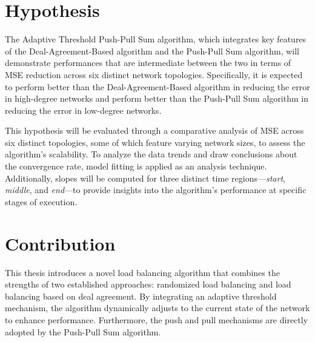 \section{Hypothesis}\label{sec:hypothesis}
The Adaptive Threshold Push-Pull Sum algorithm, which integrates key features of the Deal-Agreement-Based algorithm and the Push-Pull Sum algorithm, will demonstrate performances that are intermediate between the two in terms of MSE reduction across six distinct network topologies. Specifically, it is expected to perform better than the Deal-Agreement-Based algorithm in reducing the error in high-degree networks and perform better than the Push-Pull Sum algorithm in reducing the error in low-degree networks.

This hypothesis will be evaluated through a comparative analysis of MSE across six distinct topologies, some of which feature varying network sizes, to assess the algorithm's scalability. To analyze the data trends and draw conclusions about the convergence rate, model fitting is applied as an analysis technique. Additionally, slopes will be computed for three distinct time regions—\textit{start}, \textit{middle}, and \textit{end}—to provide insights into the algorithm's performance at specific stages of execution.

\section{Contribution}\label{sec:contribution}
This thesis introduces a novel load balancing algorithm that combines the strengths of two established approaches: randomized load balancing and load balancing based on deal agreement. By integrating an adaptive threshold mechanism, the algorithm dynamically adjusts to the current state of the network to enhance performance. Furthermore, the push and pull mechanisms are directly adopted by the Push-Pull Sum algorithm.